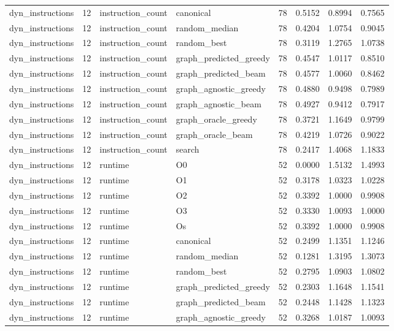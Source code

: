 \begin{table}[t]
\begin{tabular}{lrllrrrr}
dyn\_instructions & 12 & instruction\_count & canonical & 78 & 0.5152 & 0.8994 & 0.7565 \\
dyn\_instructions & 12 & instruction\_count & random\_median & 78 & 0.4204 & 1.0754 & 0.9045 \\
dyn\_instructions & 12 & instruction\_count & random\_best & 78 & 0.3119 & 1.2765 & 1.0738 \\
dyn\_instructions & 12 & instruction\_count & graph\_predicted\_greedy & 78 & 0.4547 & 1.0117 & 0.8510 \\
dyn\_instructions & 12 & instruction\_count & graph\_predicted\_beam & 78 & 0.4577 & 1.0060 & 0.8462 \\
dyn\_instructions & 12 & instruction\_count & graph\_agnostic\_greedy & 78 & 0.4880 & 0.9498 & 0.7989 \\
dyn\_instructions & 12 & instruction\_count & graph\_agnostic\_beam & 78 & 0.4927 & 0.9412 & 0.7917 \\
dyn\_instructions & 12 & instruction\_count & graph\_oracle\_greedy & 78 & 0.3721 & 1.1649 & 0.9799 \\
dyn\_instructions & 12 & instruction\_count & graph\_oracle\_beam & 78 & 0.4219 & 1.0726 & 0.9022 \\
dyn\_instructions & 12 & instruction\_count & search & 78 & 0.2417 & 1.4068 & 1.1833 \\
dyn\_instructions & 12 & runtime & O0 & 52 & 0.0000 & 1.5132 & 1.4993 \\
dyn\_instructions & 12 & runtime & O1 & 52 & 0.3178 & 1.0323 & 1.0228 \\
dyn\_instructions & 12 & runtime & O2 & 52 & 0.3392 & 1.0000 & 0.9908 \\
dyn\_instructions & 12 & runtime & O3 & 52 & 0.3330 & 1.0093 & 1.0000 \\
dyn\_instructions & 12 & runtime & Os & 52 & 0.3392 & 1.0000 & 0.9908 \\
dyn\_instructions & 12 & runtime & canonical & 52 & 0.2499 & 1.1351 & 1.1246 \\
dyn\_instructions & 12 & runtime & random\_median & 52 & 0.1281 & 1.3195 & 1.3073 \\
dyn\_instructions & 12 & runtime & random\_best & 52 & 0.2795 & 1.0903 & 1.0802 \\
dyn\_instructions & 12 & runtime & graph\_predicted\_greedy & 52 & 0.2303 & 1.1648 & 1.1541 \\
dyn\_instructions & 12 & runtime & graph\_predicted\_beam & 52 & 0.2448 & 1.1428 & 1.1323 \\
dyn\_instructions & 12 & runtime & graph\_agnostic\_greedy & 52 & 0.3268 & 1.0187 & 1.0093 \\

\end{tabular}
\end{table}
